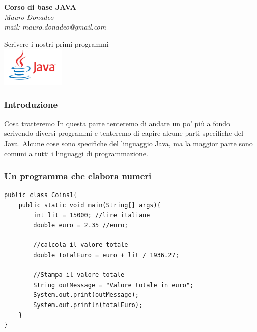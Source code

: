 \begin{frame}
	\begin{block}{}
		\begin{center}
			{\large\textbf{Corso di base JAVA}}\\
			\itshape{Mauro Donadeo}\\
			mail: mauro.donadeo@gmail.com
		\end{center}
	\end{block}
	\begin{block}{}	
		\begin{center}
			\large{Scrivere i nostri primi programmi}\\
			\includegraphics[width = 30mm]{images/java-logo.jpg}
		\end{center}
	\end{block}	
\end{frame}

\begin{frame}
\frametitle{Introduzione}
\begin{block}{Cosa tratteremo}
In questa parte tenteremo di andare un po' più a fondo scrivendo diversi programmi e tenteremo di capire
alcune parti specifiche del Java. Alcune cose sono specifiche del linguaggio Java, ma la maggior parte 
sono comuni a tutti i linguaggi di programmazione.
\end{block}
\end{frame}

\begin{frame}[fragile]
\frametitle{Un programma che elabora numeri}
\begin{lstlisting}
public class Coins1{
    public static void main(String[] args){
        int lit = 15000; //lire italiane
        double euro = 2.35 //euro;
        
        //calcola il valore totale
        double totalEuro = euro + lit / 1936.27;
        
        //Stampa il valore totale
        String outMessage = "Valore totale in euro";
        System.out.print(outMessage);
        System.out.println(totalEuro);
    }   
}
\end{lstlisting}
\end{frame}
